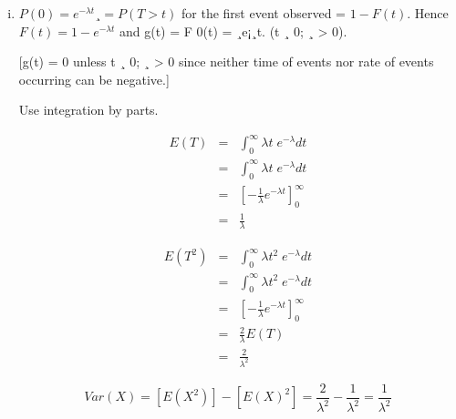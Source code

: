 \documentclass[a4paper,12pt]{article}
\begin{document}
\begin{enumerate}[(a)]
\begin{enumerate}[(i)]
\begin{table}[ht!]
\begin{tabular}{|p{15cm}|}
By interpreting this probability as the chance that the time $T$ to the next event in the process is greater than $t$, show that the probability density function (pdf) of T is given by

\[
g (x, \lambda)= \left{ \begin{cases}  
{\displaystyle {\frac { e^{-\lambda } \lambda ^{x}}{x!}}} , &  x=\{0,1,2,3,\ldots\}  \\
0, x < 0
\end{cases}
\]

    
Find the mean and variance of T.
\\ \hline
      \end{tabular}
    \end{table}
    
\item  $P(0) = e^{-\lambda t}¸ = P(T > t)$ for the first event observed = $1 - F(t)$. Hence
$F(t) = 1 - e^{-\lambda t}$ and g(t) = F
0(t) = ¸e¡¸t. (t ¸ 0; ¸ > 0).


[g(t) = 0 unless t ¸ 0; ¸ > 0 since neither time of events nor rate of events
occurring can be negative.] 


Use integration by parts.


\begin{eqnarray*}
E(T) &=& \int^{\infty}_{0} \lambda t\;e^{-\lambda} dt \\
    &=&\int^{\infty}_{0} \lambda t\;e^{-\lambda} dt \\
    &=& \left[ -\frac{1}{\lambda}e^{-\lambda t} \right]^{\infty}_{0}\\
    &=& \frac{1}{\lambda}  
\end{eqnarray*}

\begin{eqnarray*}
E(T^2) &=& \int^{\infty}_{0} \lambda t^2\;e^{-\lambda} dt \\
    &=&\int^{\infty}_{0} \lambda t^2\;e^{-\lambda} dt \\
    &=& \left[ -\frac{1}{\lambda}e^{-\lambda t} \right]^{\infty}_{0}\\
    &=& \frac{2}{\lambda}E(T)\\
    &=& \frac{2}{\lambda^2}  
\end{eqnarray*}

\[ Var(X) = [E(X^2)] - [E(X)^2] = \frac{2}{\lambda^2} - \frac{1}{\lambda^2} 
     = \frac{1}{\lambda^2} \]


\end{enumerate}
\end{enumerate}
\end{document}
